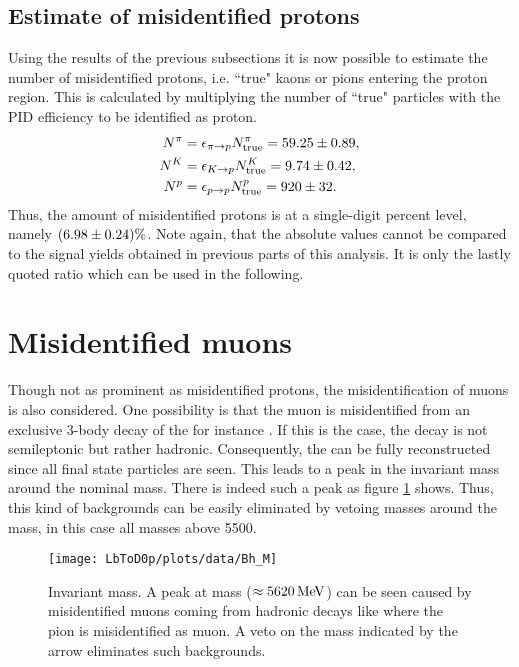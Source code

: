\subsection{Estimate of misidentified protons}
Using the results of the previous subsections it is now possible to estimate the number of misidentified protons, i.e. ``true" kaons or pions entering the proton region.
This is calculated by multiplying the number of ``true" particles  with the PID efficiency  to be identified as proton. 
\begin{align}
    N^{\pi}     &= \epsilon_{{\pi}\rightarrow{{\ensuremath{p}}}} N_{\text{true}}^{\pi}         = 59.25 \pm 0.89, \\  
    N^{{K}}   &= \epsilon_{{{K}}\rightarrow{{\ensuremath{p}}}} N_{\text{true}}^{{K}}     = 9.74 \pm 0.42, \\ 
    N^{{p}} &= \epsilon_{{{p}}\rightarrow{{\ensuremath{p}}}} N_{\text{true}}^{{p}} = 920 \pm 32.
\end{align}
Thus, the amount of misidentified protons is at a single-digit percent level, namely $(6.98 \pm 0.24)\%$. 
Note again, that the absolute values cannot be compared to the signal yields obtained in previous parts of this analysis.
It is only the lastly quoted ratio which can be used in the following.

\section{Misidentified muons}
\label{sec:BKG_misIDmu}
Though not as prominent as misidentified protons, the misidentification of muons is also considered.
One possibility is that the muon is misidentified from an exclusive 3-body decay of the \Lb for instance \decay{\Lb}{\Dz\proton\pim}.
If this is the case, the decay is not semileptonic but rather hadronic.
Consequently, the \Lb can be fully reconstructed since all final state particles are seen.
This leads to a peak in the invariant \Dz\proton\mun mass around the nominal \Lb mass.
There is indeed such a peak as figure \ref{fig:plot_D0pmuMass} shows.
Thus, this kind of backgrounds can be easily eliminated by vetoing \Dz\proton\muon masses around the \Lb mass, in this case all masses above 5500\mev.
\begin{figure}[tb]
	\centering
	\texttt{[image: LbToD0p/plots/data/Bh\_M]}
	\caption{Invariant \Dz\proton\mun mass. A peak at \Lb mass ($\approx 5620 \mathrm{\,Me\kern -0.1em V}$) can be seen caused by misidentified muons coming from hadronic decays like \decay{\Lb}{\Dz\proton\pi} where the pion is misidentified as muon. 
             A veto on the \Dz\proton\mun mass indicated by the arrow eliminates such backgrounds.}
	\label{fig:plot_D0pmuMass}
\end{figure}

